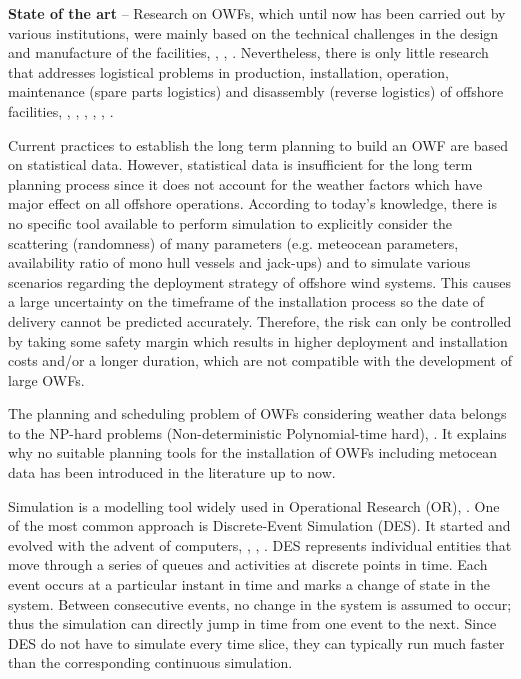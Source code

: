 \textbf{State of the art} --
Research on OWFs, which until now has been carried out by various institutions, were mainly based on the technical challenges in the design and manufacture of the facilities, \cite{Miller2013}, \cite{SerranoGonzalez2014}, \cite{Perveen2014}. Nevertheless, there is only little research that addresses logistical problems in production, installation, operation, maintenance (spare parts logistics) and disassembly (reverse logistics) of offshore facilities, \cite{Scholz2010}, \cite{Lange2012}, \cite{COMPIT11}, \cite{COMPIT12}, \cite{aitsimulation}, \cite{thalji2012}.

Current practices to establish the long term planning to build an OWF are based on statistical data. However, statistical data is insufficient for the long term planning process since it does not account for the weather factors which have major effect on all offshore operations. According to today’s knowledge, there is no specific tool available to perform simulation to explicitly consider the scattering (randomness) of many parameters (e.g. meteocean parameters, availability ratio of mono hull vessels and jack-ups) and to simulate various scenarios regarding the deployment strategy of offshore wind systems. This causes a large uncertainty on the timeframe of the installation process so the date of delivery cannot be predicted accurately. Therefore, the risk can only be controlled by taking some safety margin which results in higher deployment and installation costs and/or a longer duration, which are not compatible with the development of large OWFs.

The planning and scheduling problem of OWFs considering weather data belongs to the NP-hard problems (Non-deterministic Polynomial-time hard), \cite{leeuwen1990}. It explains why no suitable planning tools for the installation of OWFs including metocean data has been introduced in the literature up to now.

Simulation is a modelling tool widely used in Operational Research (OR), \cite{pidd2005computer,Tako_2010}. One of the most common approach is Discrete-Event Simulation (DES). It started and evolved with the advent of computers, \cite{Myron1987}, \cite {William1988}, \cite{robinson2005}. DES represents individual entities that move through a series of queues and activities at discrete points in time. Each event occurs at a particular instant in time and marks a change of state in the system. Between consecutive events, no change in the system is assumed to occur; thus the simulation can directly jump in time from one event to the next. Since DES do not have to simulate every time slice, they can typically run much faster than the corresponding continuous simulation.

